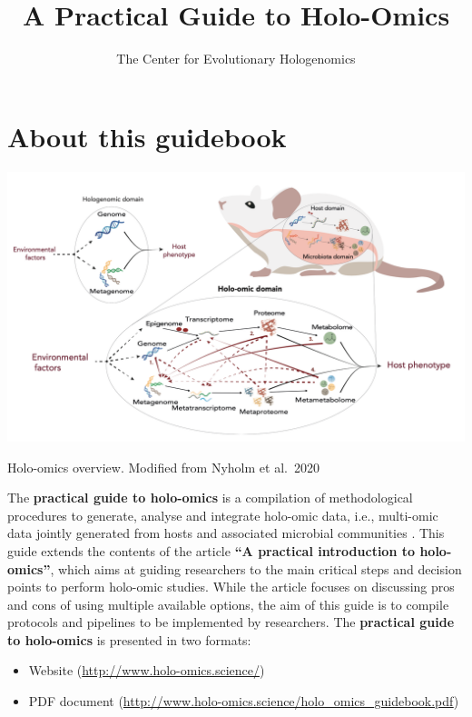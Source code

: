 \documentclass[
]{book}
\title{A Practical Guide to Holo-Omics}
\author{The Center for Evolutionary Hologenomics}
\date{}
\providecommand{\tightlist}{%
  \setlength{\itemsep}{0pt}\setlength{\parskip}{0pt}}
\begin{document}
\maketitle

{
\setcounter{tocdepth}{1}
\tableofcontents
}
\hypertarget{about-this-guidebook}{%
\chapter*{About this guidebook}\label{about-this-guidebook}}

\includegraphics{images/holo-omics_overview_nyholm.png}

Holo-omics overview. Modified from Nyholm et al.~2020 \citep{Nyholm2020-ua}

The \textbf{practical guide to holo-omics} is a compilation of methodological procedures to generate, analyse and integrate holo-omic data, i.e., multi-omic data jointly generated from hosts and associated microbial communities \citep{Nyholm2020-ua, Limborg2018-tf}. This guide extends the contents of the article \textbf{``A practical introduction to holo-omics''}, which aims at guiding researchers to the main critical steps and decision points to perform holo-omic studies. While the article focuses on discussing pros and cons of using multiple available options, the aim of this guide is to compile protocols and pipelines to be implemented by researchers. The \textbf{practical guide to holo-omics} is presented in two formats:

\begin{itemize}
\tightlist
\item
  Website (\url{http://www.holo-omics.science/})
\item
  PDF document (\url{http://www.holo-omics.science/holo_omics_guidebook.pdf})
\end{itemize}
\end{document}
